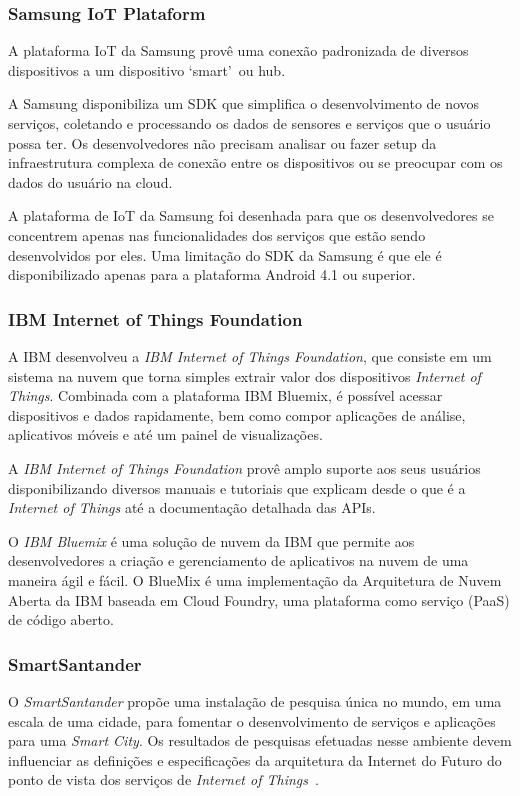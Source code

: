 \subsubsection{Samsung IoT Plataform}
A plataforma IoT da Samsung provê uma conexão padronizada de diversos dispositivos a um dispositivo
\lq smart\rq\ ou hub.

A Samsung disponibiliza um SDK que simplifica o desenvolvimento de novos serviços, coletando
e processando os dados de sensores e serviços que o usuário possa ter. Os desenvolvedores não precisam analisar ou
fazer setup da infraestrutura complexa de conexão entre os dispositivos ou se preocupar com os dados do usuário na cloud.

A plataforma de IoT da Samsung foi desenhada para que os desenvolvedores se concentrem apenas nas funcionalidades
dos serviços que estão sendo desenvolvidos por eles. Uma limitação do SDK da Samsung é que ele é disponibilizado
apenas para a plataforma Android 4.1 ou superior.

\subsubsection{IBM Internet of Things Foundation}
A IBM desenvolveu a \textit{IBM Internet of Things Foundation}, que consiste em um sistema na nuvem que torna simples
extrair valor dos dispositivos \textit{Internet of Things}. Combinada com a plataforma IBM Bluemix\texttrademark,
é possível acessar dispositivos e dados rapidamente, bem como compor aplicações de análise, aplicativos móveis 
e até um painel de visualizações.

A \textit{IBM Internet of Things Foundation} provê amplo suporte aos seus usuários
disponibilizando diversos manuais e tutoriais que explicam desde o que é a \textit{Internet of Things}
até a documentação detalhada das APIs.

O \textit{IBM Bluemix} é uma solução de nuvem da IBM que permite aos desenvolvedores a criação
e gerenciamento de aplicativos na nuvem de uma maneira ágil e fácil.
O BlueMix é uma implementação da Arquitetura de Nuvem Aberta da IBM baseada em Cloud Foundry, uma plataforma como serviço (PaaS) de código aberto.

\subsubsection{SmartSantander}
O \textit{SmartSantander} propõe uma instalação de pesquisa única no mundo, em uma escala de uma cidade,
para fomentar o desenvolvimento de serviços e aplicações para uma \textit{Smart City}.
Os resultados de pesquisas efetuadas nesse ambiente devem influenciar as definições e especificações da arquitetura da
Internet do Futuro do ponto de vista dos serviços de \textit{Internet of Things}~\cite{citeulike:13508566}.

